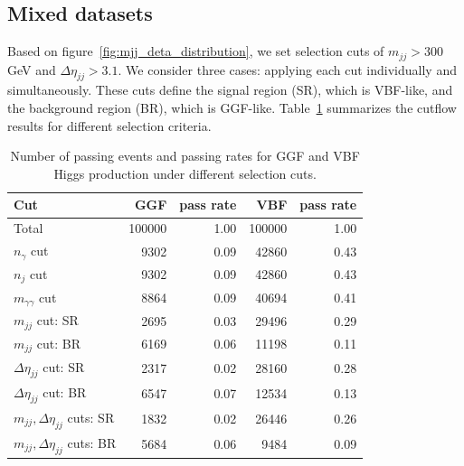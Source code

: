 \documentclass[12pt]{article}
\begin{document}
    \subsection{Mixed datasets}%
    \label{sub:mixed_datasets}
        Based on figure~\ref{fig:mjj_deta_distribution}, we set selection cuts of $m_{jj} > 300$ GeV and $\Delta\eta_{jj} > 3.1$. We consider three cases: applying each cut individually and simultaneously. These cuts define the signal region (SR), which is VBF-like, and the background region (BR), which is GGF-like. Table~\ref{tab:GGF_VBF_Higgs_cutflow_number_mixed_dataset} summarizes the cutflow results for different selection criteria.
        \begin{table}[htpb]
            \centering
            \caption{Number of passing events and passing rates for GGF and VBF Higgs production under different selection cuts.}
            \label{tab:GGF_VBF_Higgs_cutflow_number_mixed_dataset}
            \begin{tabular}{l|rr|rr}
                Cut                                & GGF    & pass rate & VBF    & pass rate \\ \hline
                Total                              & 100000 & 1.00      & 100000 & 1.00      \\
                $n_{\gamma}$ cut                   & 9302   & 0.09      & 42860  & 0.43      \\
                $n_j$ cut                          & 9302   & 0.09      & 42860  & 0.43      \\
                $m_{\gamma\gamma}$ cut             & 8864   & 0.09      & 40694  & 0.41      \\ \hline
                $m_{jj}$ cut: SR                   & 2695   & 0.03      & 29496  & 0.29      \\
                $m_{jj}$ cut: BR                   & 6169   & 0.06      & 11198  & 0.11      \\ \hline
                $\Delta\eta_{jj}$ cut: SR          & 2317   & 0.02      & 28160  & 0.28      \\
                $\Delta\eta_{jj}$ cut: BR          & 6547   & 0.07      & 12534  & 0.13      \\ \hline
                $m_{jj}, \Delta\eta_{jj}$ cuts: SR & 1832   & 0.02      & 26446  & 0.26      \\
                $m_{jj}, \Delta\eta_{jj}$ cuts: BR & 5684   & 0.06      & 9484   & 0.09     
            \end{tabular}
        \end{table}
\end{document}
